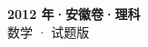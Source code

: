 \documentclass[zihao=-4, a4paper]{ctexart}
\begin{document}
\begin{center}
  {\Large\bfseries 2012 年·安徽卷·理科}\\[4pt]
  {\large 数学 · 试题版}
\end{center}
\medskip
{}

\end{document}
